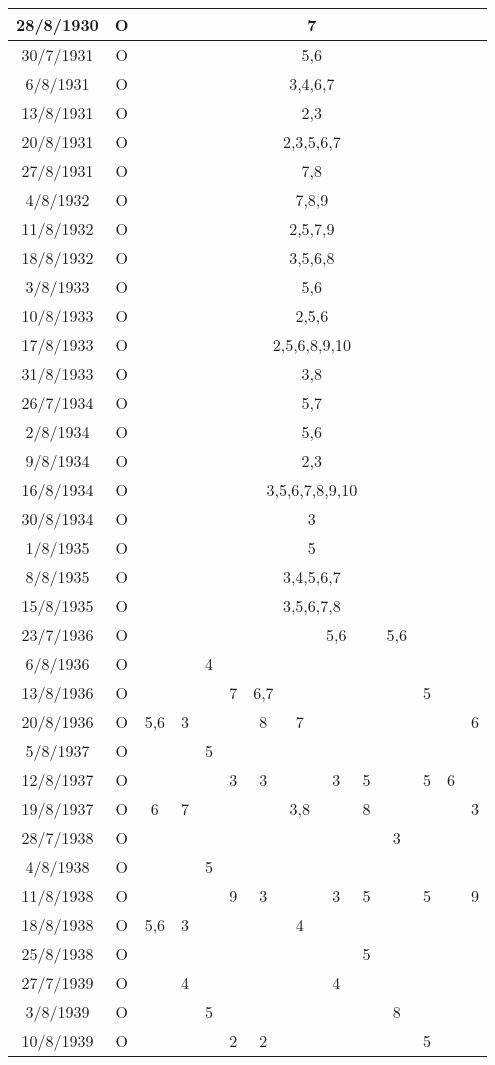 \begin{longtable}{|c|c|c|c|c|c|c|c|c|c|c|c|c|c|}
	\tabularnewline
\hline
	28/8/1930	 &
	O &
	\multicolumn{12}{c|}{7}
	\tabularnewline
\hline
	30/7/1931	 &
	O &
	\multicolumn{12}{c|}{5,6}
	\tabularnewline
\hline
	6/8/1931	 &
	O &
	\multicolumn{12}{c|}{3,4,6,7}
	\tabularnewline
\hline
	13/8/1931	 &
	O &
	\multicolumn{12}{c|}{2,3}
	\tabularnewline
\hline
	20/8/1931	 &
	O &
	\multicolumn{12}{c|}{2,3,5,6,7}
	\tabularnewline
\hline
	27/8/1931	 &
	O &
	\multicolumn{12}{c|}{7,8}
	\tabularnewline
\hline
	4/8/1932	 &
	O &
	\multicolumn{12}{c|}{7,8,9}
	\tabularnewline
\hline
	11/8/1932	 &
	O &
	\multicolumn{12}{c|}{2,5,7,9}
	\tabularnewline
\hline
	18/8/1932	 &
	O &
	\multicolumn{12}{c|}{3,5,6,8}
	\tabularnewline
\hline
	3/8/1933	 &
	O &
	\multicolumn{12}{c|}{5,6}
	\tabularnewline
\hline
	10/8/1933	 &
	O &
	\multicolumn{12}{c|}{2,5,6}
	\tabularnewline
\hline
	17/8/1933	 &
	O &
	\multicolumn{12}{c|}{2,5,6,8,9,10}
	\tabularnewline
\hline
	31/8/1933	 &
	O &
	\multicolumn{12}{c|}{3,8}
	\tabularnewline
\hline
	26/7/1934	 &
	O &
	\multicolumn{12}{c|}{5,7}
	\tabularnewline
\hline
	2/8/1934	 &
	O &
	\multicolumn{12}{c|}{5,6}
	\tabularnewline
\hline
	9/8/1934	 &
	O &
	\multicolumn{12}{c|}{2,3}
	\tabularnewline
\hline
	16/8/1934	 &
	O &
	\multicolumn{12}{c|}{3,5,6,7,8,9,10}
	\tabularnewline
\hline
	30/8/1934	 &
	O &
	\multicolumn{12}{c|}{3}
	\tabularnewline
\hline
	1/8/1935	 &
	O &
	\multicolumn{12}{c|}{5}
	\tabularnewline
\hline
	8/8/1935	 &
	O &
	\multicolumn{12}{c|}{3,4,5,6,7}
	\tabularnewline
\hline
	15/8/1935	 &
	O &
	\multicolumn{12}{c|}{3,5,6,7,8}
	\tabularnewline
\hline
	23/7/1936	 &
	O &
	& & & & & & 5,6 & & 5,6 & & &
	\tabularnewline
\hline
	6/8/1936	&
	O &
	& & 4 & & & & & & & & &
	\tabularnewline
\hline
	13/8/1936 &
	O &
	& & & 7 & 6,7 & & & & & 5 & &
	\tabularnewline
\hline
	20/8/1936 &
	O &
	5,6 & 3 & & & 8 & 7 & & & & & & 6
	\tabularnewline
\hline
	5/8/1937	&
	O &
	& & 5 & & & & & & & & &
	\tabularnewline
\hline
	12/8/1937	 &
	O &
	& & & 3 & 3 & & 3 & 5 & & 5 & 6 &
	\tabularnewline
\hline
	19/8/1937	 &
	O &
	6 & 7 & & & & 3,8 & & 8 & & & & 3
	\tabularnewline
\hline
	28/7/1938	 &
	O &
	& & & & & & & & 3 & & &
	\tabularnewline
\hline
	4/8/1938	&
	O &
	& & 5 & & & & & & & & &
	\tabularnewline
\hline
	11/8/1938	 &
	O &
	& & & 9 & 3 & & 3 & 5 & & 5 & & 9
	\tabularnewline
\hline
	18/8/1938	 &
	O &
	5,6 & 3 & & & & 4 & & & & & &
	\tabularnewline
\hline
	25/8/1938 &
	O &
	& & & & & & & 5 & & & &
	\tabularnewline
\hline
	27/7/1939 &
	O &
	& 4 & & & & & 4 & & & & &
	\tabularnewline
\hline
	3/8/1939	&
	O &
	& & 5 & & & & & & 8 & & &
	\tabularnewline
\hline
	10/8/1939	 &
	O &
	& & & 2 & 2 & & & & & 5 & &
	\tabularnewline

\end{longtable}
